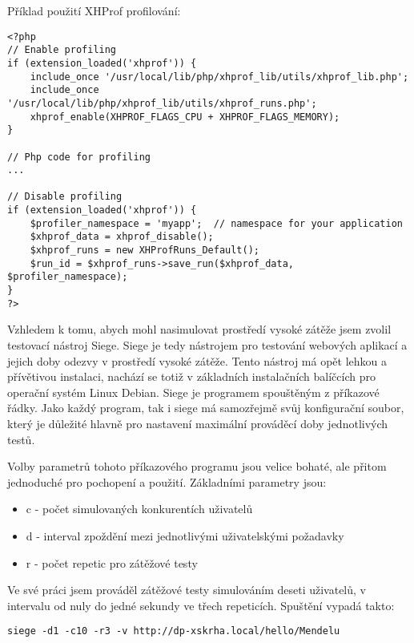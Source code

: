 \documentclass[12pt]{article}
\begin{document}
\newpage
Příklad použití XHProf profilování:
\begin{scriptsize}
\begin{verbatim}
<?php
// Enable profiling
if (extension_loaded('xhprof')) {
    include_once '/usr/local/lib/php/xhprof_lib/utils/xhprof_lib.php';
    include_once '/usr/local/lib/php/xhprof_lib/utils/xhprof_runs.php';
    xhprof_enable(XHPROF_FLAGS_CPU + XHPROF_FLAGS_MEMORY);
}

// Php code for profiling
...

// Disable profiling
if (extension_loaded('xhprof')) {
    $profiler_namespace = 'myapp';  // namespace for your application
    $xhprof_data = xhprof_disable();
    $xhprof_runs = new XHProfRuns_Default();
    $run_id = $xhprof_runs->save_run($xhprof_data, $profiler_namespace);
}
?>
\end{verbatim}
\end{scriptsize}

Vzhledem k tomu, abych mohl nasimulovat prostředí vysoké zátěže jsem zvolil testovací nástroj Siege. Siege je tedy nástrojem pro testování webových aplikací a jejich doby odezvy v prostředí vysoké zátěže. Tento nástroj má opět lehkou a přívětivou instalaci, nachází se totiž v základních instalačních balíčcích pro operační systém Linux Debian. Siege je programem spouštěným z příkazové řádky. Jako každý program, tak i siege má samozřejmě svůj konfigurační soubor, který je důležité hlavně pro nastavení maximální prováděcí doby jednotlivých testů.

Volby parametrů tohoto příkazového programu jsou velice bohaté, ale přitom jednoduché pro pochopení a použití. Základními parametry jsou:

\begin{itemize}
\item c - počet simulovaných konkurentích uživatelů
\item d - interval zpoždění mezi jednotlivými uživatelskými požadavky
\item r - počet repetic pro zátěžové testy
\end{itemize}

Ve své práci jsem prováděl zátěžové testy simulováním deseti uživatelů, v intervalu od nuly do jedné sekundy ve třech repeticích. Spuštění vypadá takto:
\begin{scriptsize}
\begin{verbatim}
siege -d1 -c10 -r3 -v http://dp-xskrha.local/hello/Mendelu
\end{verbatim}
\end{scriptsize}
\end{document}
